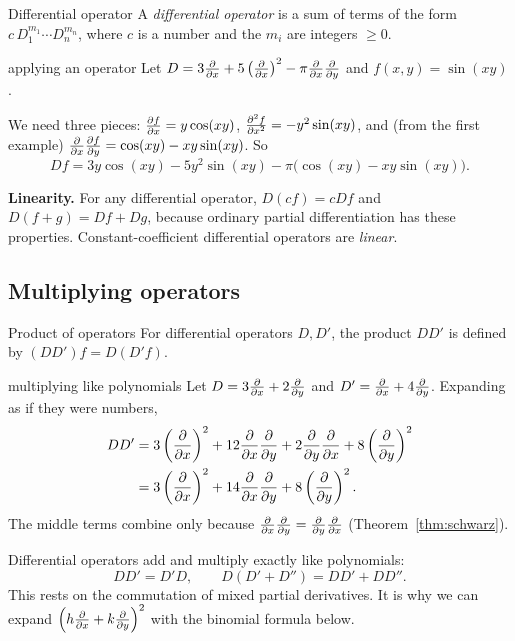 \begin{definition}{Differential operator}
A \emph{differential operator} is a sum of terms of the form $c\,D_1^{m_1}\cdots D_n^{m_n}$,
where $c$ is a number and the $m_i$ are integers $\ge0$.
\end{definition}

\begin{example}{applying an operator}
Let $D=3\frac{\partial }{\partial x}+5\left(\frac{\partial }{\partial x}\right)^2-\pi\frac{\partial }{\partial x}\frac{\partial }{\partial y}$ and $f(x,y)=\sin(xy)$.

We need three pieces: $\frac{\partial f}{\partial x}=y\cos(xy)$, $\frac{\partial^2 f}{\partial x^2}=-y^2\sin(xy)$, and (from the first example)
$\frac{\partial }{\partial x}\frac{\partial f}{\partial y}=\cos(xy)-xy\sin(xy)$. So
\[
Df=3y\cos(xy)-5y^2\sin(xy)-\pi\big(\cos(xy)-xy\sin(xy)\big).
\]
\end{example}

\textbf{Linearity.} For any differential operator, $D(cf)=cDf$ and $D(f+g)=Df+Dg$, because
ordinary partial differentiation has these properties. Constant-coefficient differential
operators are \emph{linear}.

\subsection{Multiplying operators}

\begin{definition}{Product of operators}
For differential operators $D,D'$, the product $DD'$ is defined by $(DD')f=D(D'f)$.
\end{definition}

\begin{example}{multiplying like polynomials}
Let $D=3\frac{\partial }{\partial x}+2\frac{\partial }{\partial y}$ and $D'=\frac{\partial }{\partial x}+4\frac{\partial }{\partial y}$. Expanding as if they were numbers,
\begin{align*}
DD'&=3\left(\frac{\partial }{\partial x}\right)^2+12\frac{\partial }{\partial x}\frac{\partial }{\partial y}+2\frac{\partial }{\partial y}\frac{\partial }{\partial x}+8\left(\frac{\partial }{\partial y}\right)^2\\
&=3\left(\frac{\partial }{\partial x}\right)^2+14\frac{\partial }{\partial x}\frac{\partial }{\partial y}+8\left(\frac{\partial }{\partial y}\right)^2 .
\end{align*}
The middle terms combine only because $\frac{\partial }{\partial x}\frac{\partial }{\partial y}=\frac{\partial }{\partial y}\frac{\partial }{\partial x}$ (Theorem~\ref{thm:schwarz}).
\end{example}

\begin{keyidea}
Differential operators add and multiply exactly like polynomials:
\[ DD'=D'D,\qquad D(D'+D'')=DD'+DD'' . \]
This rests on the commutation of mixed partial derivatives. It is why we can expand
$\left(h\frac{\partial }{\partial x}+k\frac{\partial }{\partial y}\right)^2$ with the binomial formula below.
\end{keyidea}

